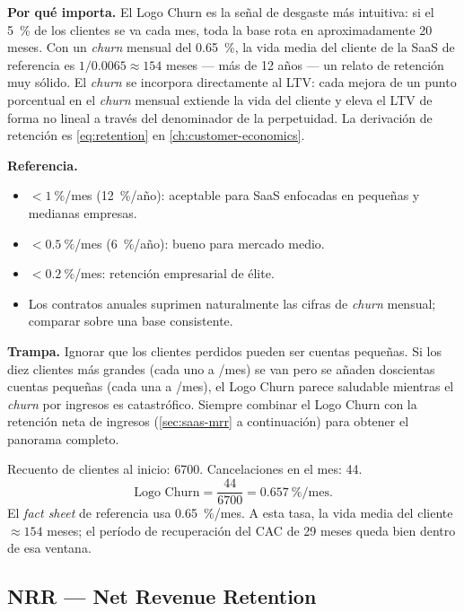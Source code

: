 \textbf{Por qué importa.} El Logo Churn es la señal de desgaste más intuitiva: si el
\qty{5}{\percent} de los clientes se va cada mes, toda la base rota en aproximadamente
20 meses. Con un \emph{churn} mensual del \qty{0.65}{\percent}, la vida media del cliente
de la SaaS de referencia es $1/0.0065 \approx 154$ meses --- más de 12 años --- un relato
de retención muy sólido. El \emph{churn} se incorpora directamente al LTV: cada mejora de
un punto porcentual en el \emph{churn} mensual extiende la vida del cliente y eleva el LTV
de forma no lineal a través del denominador de la perpetuidad. La derivación de retención es
\cref{eq:retention} en \cref{ch:customer-economics}.

\textbf{Referencia.}
\begin{itemize}
  \item $<\qty{1}{\percent}$/mes (\qty{12}{\percent}/año): aceptable para SaaS enfocadas en
    pequeñas y medianas empresas.
  \item $<\qty{0.5}{\percent}$/mes (\qty{6}{\percent}/año): bueno para mercado medio.
  \item $<\qty{0.2}{\percent}$/mes: retención empresarial de élite.
  \item Los contratos anuales suprimen naturalmente las cifras de \emph{churn} mensual;
    comparar sobre una base consistente.
\end{itemize}

\textbf{Trampa.} Ignorar que los clientes perdidos pueden ser cuentas pequeñas. Si los diez
clientes más grandes (cada uno a /mes) se van pero se añaden doscientas cuentas
pequeñas (cada una a /mes), el Logo Churn parece saludable mientras el \emph{churn}
por ingresos es catastrófico. Siempre combinar el Logo Churn con la retención neta de ingresos
(\cref{sec:saas-mrr} a continuación) para obtener el panorama completo.

\begin{example}
Recuento de clientes al inicio: \num{6700}. Cancelaciones en el mes: 44.
\[
  \text{Logo Churn} = \frac{44}{\num{6700}} = \qty{0.657}{\percent}/\text{mes}.
\]
El \emph{fact sheet} de referencia usa \qty{0.65}{\percent}/mes. A esta tasa, la vida media
del cliente $\approx 154$ meses; el período de recuperación del CAC de 29 meses queda bien
dentro de esa ventana.
\end{example}


\subsection{NRR --- Net Revenue Retention}

